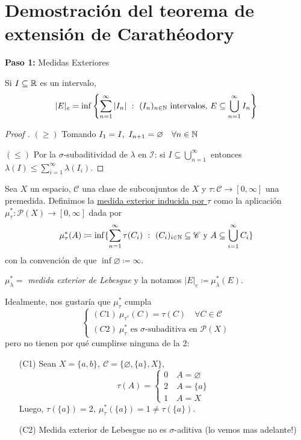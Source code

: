 
\section{Demostración del teorema de extensión de Carathéodory}

\textbf{Paso 1:} Medidas Exteriores

\begin{prop}
	Si $I \subseteq \mathbb{R}$ es un intervalo,
	\[ |E|_{e} = \inf \left\{ \sum_{n=1}^{\infty} |I_n| \ : \  (I_n)_{n\in\mathbb{N}} \text{ intervalos, } E \subseteq \bigcup_{n=1}^{\infty} I_n \right\} \]
\end{prop}
\begin{proof}[Proof ]
	\text{} \par
	\noindent $(\geq)$ Tomando $I_1 = I,\ I_{n+1} = \varnothing \quad \forall n \in \mathbb{N}$ \par
	\medskip
	\noindent $(\leq)$ Por la $\sigma$-subaditividad de $\lambda$ en $\mathcal{I}$: si $I\subseteq \bigcup_{n=1}^{\infty}$ entonces $\lambda(I) \leq \sum_{i=1}^{\infty} \lambda(I_i)$.
\end{proof}

\begin{definition}
	Sea $X$ un espacio, $\mathscr{C}$ una clase de subconjuntos de $X$ y $\tau : \mathscr{C} \to [0,\infty]$ una premedida. Definimos la \underline{medida exterior inducida por $\tau$} como la aplicación $\mu_{\tau}^{*} : \mathscr{P}(X) \to [0,\infty]$ dada por
	\[ \mu_{\tau}^{*}(A) \coloneq \inf \{ \sum_{n=1}^{\infty} \tau(C_i) \ : \ (C_i)_{i\in\mathbb{N}} \subseteq \mathscr{C} \text{ y } A \subseteq \bigcup_{i=1}^{\infty} C_i \} \]
	con la convención de que $\inf \varnothing \coloneq \infty$.
\end{definition}

\begin{eg}
	$\mu_{\lambda}^{*} =$ \textit{medida exterior de Lebesgue} y la notamos $|E|_e \coloneq \mu_{\lambda}^{*}(E)$.
\end{eg}

\noindent Idealmente, nos gustaría que $\mu_{\tau}^{*}$ cumpla
\[ \begin{cases}
	(C1) \ \mu_{\tau^{*}}(C) = \tau(C) \quad \forall C \in \mathscr{C} \\
	(C2) \ \mu_{\tau}^{*} \text{ es } \sigma\text{-subaditiva en } \mathscr{P}(X)
\end{cases} \]
pero no tienen por qué cumplirse ninguna de la 2:
\begin{enumerate}
	\item[(C1)] Sean $X = \{a,b\},\ \mathscr{C} = \{\varnothing, \{a\}, X\}, $
	\[\tau(A) = \begin{cases}
		0 \quad A = \varnothing \\
		2 \quad A = \{a\} \\
		1 \quad A = X
	\end{cases} \] 
	Luego, $\tau(\{a\}) = 2,\ \mu_{\tau}^{*}(\{a\}) = 1 \neq \tau(\{a\})$.

	\item[(C2)] Medida exterior de Lebesgue no es $\sigma$-aditiva (lo vemos mas adelante!)
\end{enumerate}

